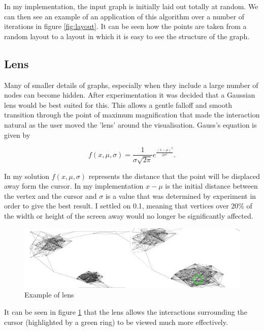 \documentclass[12pt,a4paper]{article}
\begin{document}
In my implementation, the input graph is initially laid out totally at random. We can then see an example of an application of this algorithm over a number of iterations in figure \ref{fig:layout}. It can be seen how the points are taken from a random layout to a layout in which it is easy to see the structure of the graph.

\subsection{Lens}

Many of smaller details of graphs, especially when they include a large number of nodes can become hidden. After experimentation it was decided that a Gaussian lens would be best suited for this. This allows a gentle falloff and smooth transition through the point of maximum magnification that made the interaction natural as the user moved the 'lens' around the visualisation. Gauss's equation is given by 

\begin{equation}
\label{eq:Guass}
f(x,\mu,\sigma)=\frac{1}{\sigma\sqrt{2\pi}}e^{\frac{(x-\mu)^{2}}{2\sigma^{2}}}.
\end{equation}

In my solution $f(x, \mu, \sigma)$ represents the distance that the point will be displaced away form the cursor. In my implementation $x-\mu$ is the initial distance between the vertex and the cursor and $\sigma$ is a value that was determined by experiment in order to give the best result. I settled on 0.1, meaning that vertices over 20\% of the width or height of the screen away would no longer be significantly affected.

\begin{figure}[htb]
\caption{Example of lens}
\label{fig:lens}
\centering
\includegraphics[scale=0.12]{Gaussian.png}
\end{figure}

It can be seen in figure \ref{fig:lens} that the lens allows the interactions surrounding the cursor (highlighted by a green ring) to be viewed much more effectively.
\end{document}
